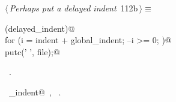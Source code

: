 \documentclass[a4paper]{report}
\begin{document}
\begin{flushleft} \small
\begin{minipage}{\linewidth}\label{scrap237}\raggedright\small
{} $\langle\,${\it Perhaps put a delayed indent}\nobreak\ {\footnotesize {112b}}$\,\rangle\equiv$
\vspace{-1ex}
\begin{list}{}{} \item
\mbox{}\verb@if (delayed_indent)@\\
\mbox{}\verb@   for (i = indent + global_indent; --i >= 0; )@\\
\mbox{}\verb@      putc(' ', file);@\\
\mbox{}\verb@@{\NWsep}
\end{list}
\vspace{-1.5ex}
\footnotesize
\begin{list}{}{\setlength{\itemsep}{-\parsep}\setlength{\itemindent}{-\leftmargin}}
\item \NWtxtMacroRefIn\ .
\item \NWtxtIdentsUsed\nobreak\  \verb@delayed_indent@\nobreak\ , \verb@putc@\nobreak\ .
\item{}
\end{list}
\end{minipage}\vspace{4ex}
\end{flushleft}
\end{document}
